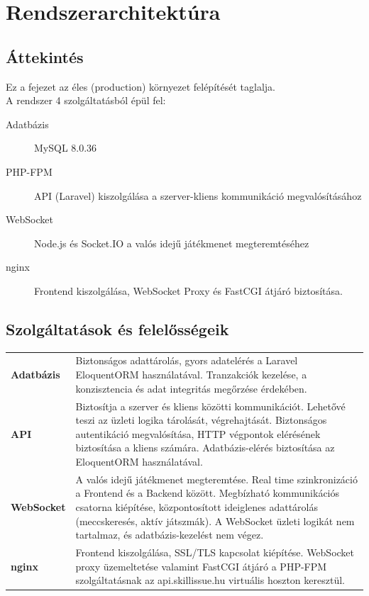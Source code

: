 \chapter{Rendszerarchitektúra}
\section{Áttekintés}
Ez a fejezet az éles (production) környezet felépítését taglalja.\\
A rendszer 4 szolgáltatásból épül fel:
\begin{description}
    \item[Adatbázis]MySQL 8.0.36 
    \item[PHP-FPM]API (Laravel) kiszolgálása a szerver-kliens kommunikáció megvalósításához
    \item[WebSocket]Node.js és Socket.IO a valós idejű játékmenet megteremtéséhez
    \item[nginx]Frontend kiszolgálása, WebSocket Proxy és FastCGI átjáró biztosítása.
\end{description}
\section{Szolgáltatások és felelősségeik}
\begin{tabular}{l p{14cm}}
    \textbf{Adatbázis} & Biztonságos adattárolás, gyors adatelérés a Laravel EloquentORM használatával. Tranzakciók kezelése, a konzisztencia és adat integritás megőrzése érdekében.\\
    
    \textbf{API} & Biztosítja a szerver és kliens közötti kommunikációt. Lehetővé teszi az üzleti logika tárolását, végrehajtását. Biztonságos autentikáció megvalósítása, HTTP végpontok elérésének biztosítása a kliens számára. Adatbázis-elérés biztosítása az EloquentORM használatával.\\
    
    \textbf{WebSocket} & A valós idejű játékmenet megteremtése. Real time szinkronizáció a Frontend és a Backend között. Megbízható kommunikációs csatorna kiépítése, központosított ideiglenes adattárolás (meccskeresés, aktív játszmák). A WebSocket üzleti logikát nem tartalmaz, és adatbázis-kezelést nem végez.\\
    
    \textbf{nginx} & Frontend kiszolgálása, SSL/TLS kapcsolat kiépítése. WebSocket proxy üzemeltetése valamint FastCGI átjáró a PHP-FPM szolgáltatásnak az api.skillissue.hu virtuális hoszton keresztül.\\
\end{tabular}
